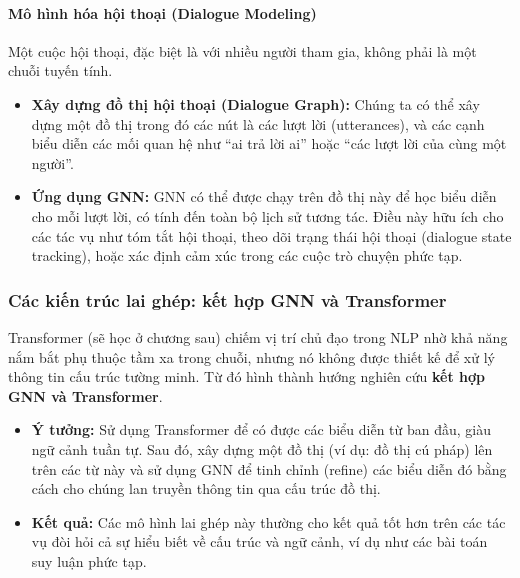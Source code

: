 \paragraph{Mô hình hóa hội thoại (Dialogue Modeling)}
Một cuộc hội thoại, đặc biệt là với nhiều người tham gia, không phải là một chuỗi tuyến tính.
\begin{itemize}
    \item \textbf{Xây dựng đồ thị hội thoại (Dialogue Graph):} Chúng ta có thể xây dựng một đồ thị trong đó các nút là các lượt lời (utterances), và các cạnh biểu diễn các mối quan hệ như “ai trả lời ai” hoặc “các lượt lời của cùng một người”.
    \item \textbf{Ứng dụng GNN:} GNN có thể được chạy trên đồ thị này để học biểu diễn cho mỗi lượt lời, có tính đến toàn bộ lịch sử tương tác. Điều này hữu ích cho các tác vụ như tóm tắt hội thoại, theo dõi trạng thái hội thoại (dialogue state tracking), hoặc xác định cảm xúc trong các cuộc trò chuyện phức tạp.
\end{itemize}

\subsubsection{Các kiến trúc lai ghép: kết hợp GNN và Transformer}
\label{ssec:gnn_transformer}

Transformer (sẽ học ở chương sau) chiếm vị trí chủ đạo trong NLP nhờ khả năng nắm bắt phụ thuộc tầm xa trong chuỗi, nhưng nó không được thiết kế để xử lý thông tin cấu trúc tường minh. Từ đó hình thành hướng nghiên cứu \textbf{kết hợp GNN và Transformer}.
\begin{itemize}
    \item \textbf{Ý tưởng:} Sử dụng Transformer để có được các biểu diễn từ ban đầu, giàu ngữ cảnh tuần tự. Sau đó, xây dựng một đồ thị (ví dụ: đồ thị cú pháp) lên trên các từ này và sử dụng GNN để tinh chỉnh (refine) các biểu diễn đó bằng cách cho chúng lan truyền thông tin qua cấu trúc đồ thị.
    \item \textbf{Kết quả:} Các mô hình lai ghép này thường cho kết quả tốt hơn trên các tác vụ đòi hỏi cả sự hiểu biết về cấu trúc và ngữ cảnh, ví dụ như các bài toán suy luận phức tạp.
\end{itemize}

